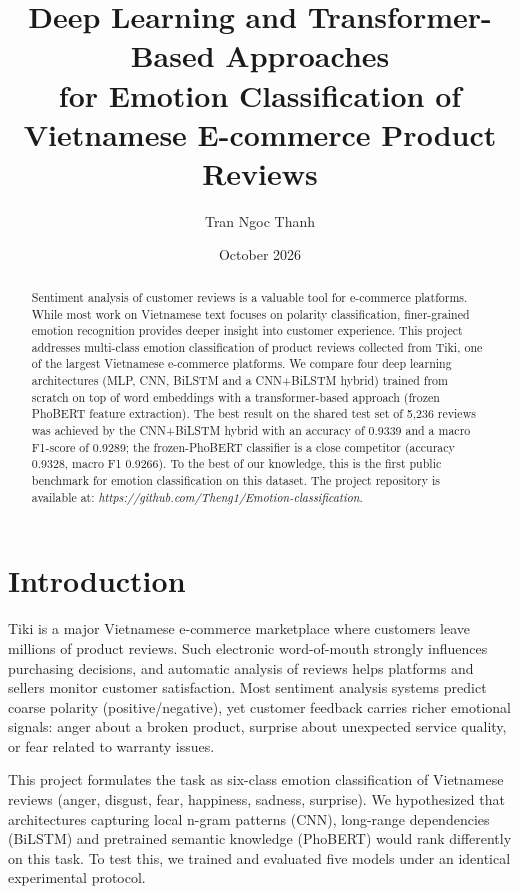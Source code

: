 \documentclass[11pt]{article}
\title{Deep Learning and Transformer-Based Approaches\\for Emotion Classification of Vietnamese E-commerce Product Reviews}
\author{Tran Ngoc Thanh}
\date{October 2026}
\begin{document}
\maketitle

\begin{abstract}
Sentiment analysis of customer reviews is a valuable tool for e-commerce platforms. While most work on Vietnamese text focuses on polarity classification, finer-grained emotion recognition provides deeper insight into customer experience. This project addresses multi-class emotion classification of product reviews collected from Tiki, one of the largest Vietnamese e-commerce platforms. We compare four deep learning architectures (MLP, CNN, BiLSTM and a CNN+BiLSTM hybrid) trained from scratch on top of word embeddings with a transformer-based approach (frozen PhoBERT feature extraction). The best result on the shared test set of 5,236 reviews was achieved by the CNN+BiLSTM hybrid with an accuracy of 0.9339 and a macro F1-score of 0.9289; the frozen-PhoBERT classifier is a close competitor (accuracy 0.9328, macro F1 0.9266). To the best of our knowledge, this is the first public benchmark for emotion classification on this dataset. The project repository is available at: \textit{https://github.com/Theng1/Emotion-classification}.
\end{abstract}

\section{Introduction}
Tiki is a major Vietnamese e-commerce marketplace where customers leave millions of product reviews. Such electronic word-of-mouth strongly influences purchasing decisions, and automatic analysis of reviews helps platforms and sellers monitor customer satisfaction. Most sentiment analysis systems predict coarse polarity (positive/negative), yet customer feedback carries richer emotional signals: anger about a broken product, surprise about unexpected service quality, or fear related to warranty issues.

This project formulates the task as six-class emotion classification of Vietnamese reviews (anger, disgust, fear, happiness, sadness, surprise). We hypothesized that architectures capturing local n-gram patterns (CNN), long-range dependencies (BiLSTM) and pretrained semantic knowledge (PhoBERT) would rank differently on this task. To test this, we trained and evaluated five models under an identical experimental protocol.
\end{document}
